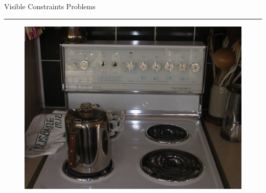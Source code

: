 \documentclass[pdf]{beamer}
\begin{document}

\begin{frame}{Visible Constraints Problems}{\textcolor{red}{\rule{12cm}{1.2pt}}}

\begin{figure}[b]
    	\includegraphics[scale = 0.40, center]{16_cooker.jpg}
    \end{figure}
\end{frame}



\end{document}
